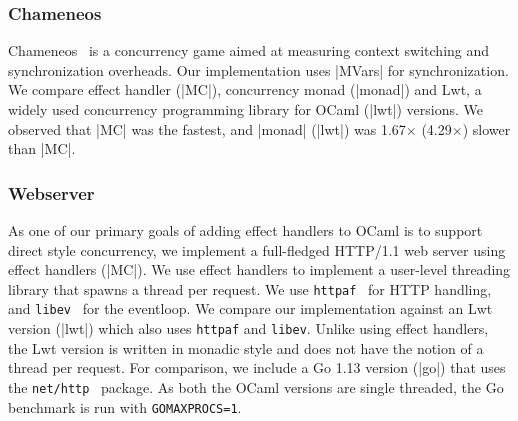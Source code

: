 \documentclass[sigplan,screen]{acmart}
\begin{document}
\subsubsection{Chameneos}

Chameneos~\cite{Chameneos} is a concurrency game aimed at measuring context
switching and synchronization overheads. Our implementation uses |MVars| for
synchronization. We compare effect handler (|MC|), concurrency monad (|monad|)
and Lwt, a widely used concurrency programming library for OCaml (|lwt|)
versions. We observed that |MC| was the fastest, and |monad| (|lwt|) was
1.67$\times$ (4.29$\times$) slower than |MC|.

\subsubsection{Webserver}

As one of our primary goals of adding effect handlers to OCaml is to support
direct style concurrency, we implement a full-fledged HTTP/1.1 web server using
effect handlers (|MC|). We use effect handlers to implement a user-level
threading library that spawns a thread per request. We use
\texttt{httpaf}~\cite{httpaf} for HTTP handling, and
\texttt{libev}~\cite{libev} for the eventloop. We compare our implementation
against an Lwt version (|lwt|) which also uses \texttt{httpaf} and
\texttt{libev}. Unlike using effect handlers, the Lwt version is written in
monadic style and does not have the notion of a thread per request. For
comparison, we include a Go 1.13 version (|go|) that uses the
\texttt{net/http}~\cite{nethttp} package. As both the OCaml versions are single
threaded, the Go benchmark is run with \texttt{GOMAXPROCS=1}.
\end{document}
